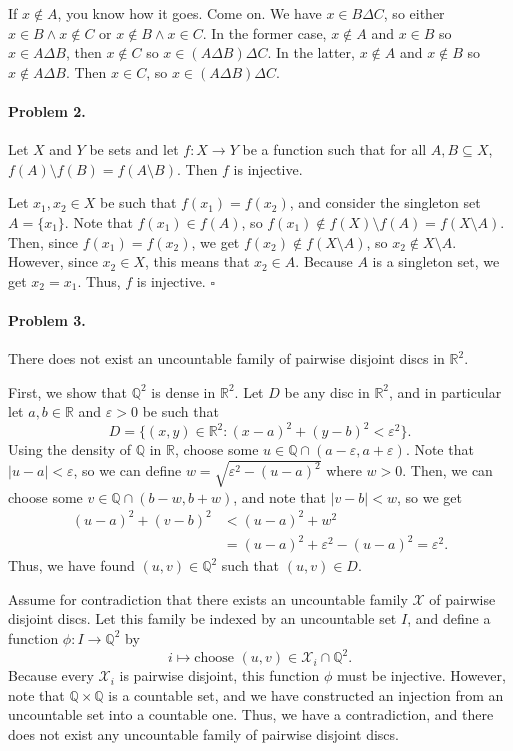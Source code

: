\documentclass[12pt]{article}
\begin{document}
If $x \not \in A$, you know how it goes. Come on. We have $x \in B \Delta C$, so either $x \in B \land x \not\in C$ or $x \not\in B \land x \in C$. In the former case, $x \not \in A$ and $x \in B$ so $x \in A \Delta B$, then $x \not\in C$ so $x \in (A\Delta B) \Delta C$. In the latter, $x \not\in A$ and $x \not\in B$ so $x \not\in A \Delta B$. Then $x \in C$, so $x \in (A\Delta B) \Delta C$.

\paragraph{Problem 2.} Let $X$ and $Y$ be sets and let $f : X \to Y$ be a function such that for all $A, B \subseteq X$, $f(A) \setminus f(B) = f(A \setminus B)$. Then $f$ is injective.

Let $x_1, x_2 \in X$ be such that $f(x_1) = f(x_2)$, and consider the singleton set $A = \{ x_1 \}$. Note that $f(x_1) \in f(A)$, so $f(x_1) \not\in f(X) \setminus f(A) = f(X \setminus A)$. Then, since $f(x_1) = f(x_2)$, we get $f(x_2) \not\in f(X \setminus A)$, so $x_2 \not\in X \setminus A$. However, since $x_2 \in X$, this means that $x_2 \in A$. Because $A$ is a singleton set, we get $x_2 = x_1$. Thus, $f$ is injective. $\square$

\paragraph{Problem 3.} There does not exist an uncountable family of pairwise disjoint discs in $\mathbb{R}^2$. 

First, we show that $\mathbb{Q}^2$ is dense in $\mathbb{R}^2$. Let $D$ be any disc in $\mathbb{R}^2$, and in particular let $a,b \in \mathbb R$ and $\varepsilon > 0$ be such that
\[D = \{(x,y) \in \mathbb{R}^2 : (x-a)^2 + (y-b)^2 < \varepsilon^2 \}. \]
Using the density of $\mathbb Q$ in $\mathbb R$, choose some $u \in \mathbb Q \cap (a-\varepsilon, a + \varepsilon)$. Note that $|u - a| < \varepsilon$, so we can define $w = \sqrt{\varepsilon^2 - (u - a)^2}$ where $w > 0$. Then, we can choose some $v \in \mathbb Q \cap (b- w, b + w)$, and note that $|v - b| < w$, so we get
\begin{align*}
    (u - a)^2 + (v - b)^2 &< (u-a)^2 + w^2 \\
    &= (u-a)^2 + \varepsilon^2 - (u-a)^2 = \varepsilon^2.
\end{align*}
Thus, we have found $(u,v) \in \mathbb{Q}^2$ such that $(u,v) \in D$.

Assume for contradiction that there exists an uncountable family $\mathcal{X}$ of pairwise disjoint discs. Let this family be indexed by an uncountable set $I$, and define a function $\phi : I \to \mathbb{Q}^2$ by \[i \mapsto \text{choose } (u,v) \in \mathcal{X}_i \cap \mathbb{Q}^2. \]
Because every $\mathcal{X}_i$ is pairwise disjoint, this function $\phi$ must be injective. However, note that $\mathbb{Q}\times\mathbb{Q}$ is a countable set, and we have constructed an injection from an uncountable set into a countable one. Thus, we have a contradiction, and there does not exist any uncountable family of pairwise disjoint discs.
\end{document}
